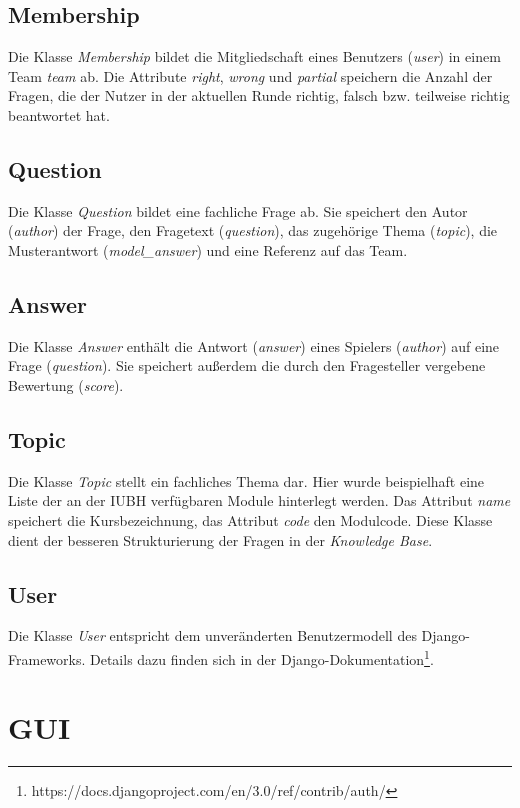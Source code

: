 \documentclass[a4paper,11pt,listof=numbered,glossary=totoc,parskip=half,toc=bib]{scrreprt}
\begin{document}
	\subsection{Membership}
	Die Klasse \textit{Membership} bildet die Mitgliedschaft eines Benutzers (\textit{user}) in einem Team \textit{team} ab.
	Die Attribute \textit{right}, \textit{wrong} und \textit{partial} speichern die Anzahl der Fragen, die der Nutzer in der aktuellen Runde richtig, falsch bzw. teilweise richtig beantwortet hat. 
	
	\subsection{Question}
	Die Klasse \textit{Question} bildet eine fachliche Frage ab. Sie speichert den Autor (\textit{author}) der Frage, den Fragetext (\textit{question}), das zugehörige Thema (\textit{topic}), die Musterantwort (\textit{model\_{}answer}) und eine Referenz auf das Team.
	
	\subsection{Answer}
	Die Klasse \textit{Answer} enthält die Antwort (\textit{answer}) eines Spielers (\textit{author}) auf eine Frage (\textit{question}). Sie speichert außerdem die durch den Fragesteller vergebene Bewertung (\textit{score}).
	
	\subsection{Topic}
	Die Klasse \textit{Topic} stellt ein fachliches Thema dar. Hier wurde beispielhaft eine Liste der an der IUBH verfügbaren Module hinterlegt werden. Das Attribut \textit{name} speichert die Kursbezeichnung, das Attribut \textit{code} den Modulcode. Diese Klasse dient der besseren Strukturierung der Fragen in der \textit{Knowledge Base}.

	\subsection{User}
	Die Klasse \textit{User} entspricht dem unveränderten Benutzermodell des Django-Frameworks. Details dazu finden sich in der Django-Dokumentation\footnote{https://docs.djangoproject.com/en/3.0/ref/contrib/auth/}.	
	
	\section{GUI}
	
\end{document}
